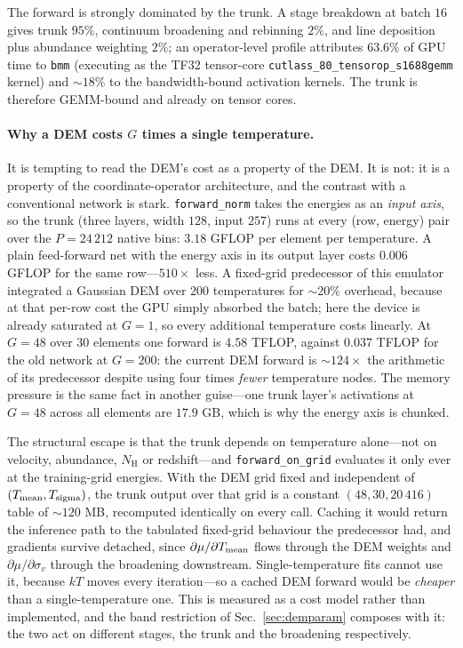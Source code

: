 \documentclass[11pt,a4paper]{article}
\newcommand{\nh}{N_{\mathrm{H}}}
\newcommand{\code}[1]{\texttt{#1}}
\begin{document}
The forward is strongly dominated by the trunk. A stage breakdown at batch $16$
gives trunk $95\%$, continuum broadening and rebinning $2\%$, and line
deposition plus abundance weighting $2\%$; an operator-level profile attributes
$63.6\%$ of GPU time to \code{bmm} (executing as the TF32 tensor-core
\code{cutlass\_80\_tensorop\_s1688gemm} kernel) and ${\sim}18\%$ to the
bandwidth-bound activation kernels. The trunk is therefore GEMM-bound and
already on tensor cores.

\paragraph{Why a DEM costs $G$ times a single temperature.} It is tempting to
read the DEM's cost as a property of the DEM. It is not: it is a property of the
coordinate-operator architecture, and the contrast with a conventional network
is stark. \code{forward\_norm} takes the energies as an \emph{input axis}, so
the trunk (three layers, width $128$, input $257$) runs at every
(row, energy) pair over the $P=24\,212$ native bins: $3.18$ GFLOP per element
per temperature. A plain feed-forward net with the energy axis in its output
layer costs $0.006$ GFLOP for the same row---$510\times$ less. A fixed-grid
predecessor of this emulator integrated a Gaussian DEM over $200$ temperatures
for ${\sim}20\%$ overhead, because at that per-row cost the GPU simply absorbed
the batch; here the device is already saturated at $G=1$, so every additional
temperature costs linearly. At $G=48$ over 30 elements one forward is
$4.58$ TFLOP, against $0.037$ TFLOP for the old network at $G=200$: the current
DEM forward is ${\sim}124\times$ the arithmetic of its predecessor despite using
four times \emph{fewer} temperature nodes. The memory pressure is the same fact
in another guise---one trunk layer's activations at $G=48$ across all elements
are $17.9$ GB, which is why the energy axis is chunked.

The structural escape is that the trunk depends on temperature alone---not on
velocity, abundance, $\nh$ or redshift---and \code{forward\_on\_grid} evaluates
it only ever at the training-grid energies. With the DEM grid fixed and
independent of $(T_{\rm mean}, T_{\rm sigma})$, the trunk output over that grid
is a constant $(48, 30, 20\,416)$ table of ${\sim}120$ MB, recomputed
identically on every call. Caching it would return the inference path to the
tabulated fixed-grid behaviour the predecessor had, and gradients survive
detached, since $\partial\mu/\partial T_{\rm mean}$ flows through the DEM
weights and $\partial\mu/\partial\sigma_v$ through the broadening downstream.
Single-temperature fits cannot use it, because $kT$ moves every iteration---so
a cached DEM forward would be \emph{cheaper} than a single-temperature one.
This is measured as a cost model rather than implemented, and the band
restriction of Sec.~\ref{sec:demparam} composes with it: the two act on
different stages, the trunk and the broadening respectively.
\end{document}
